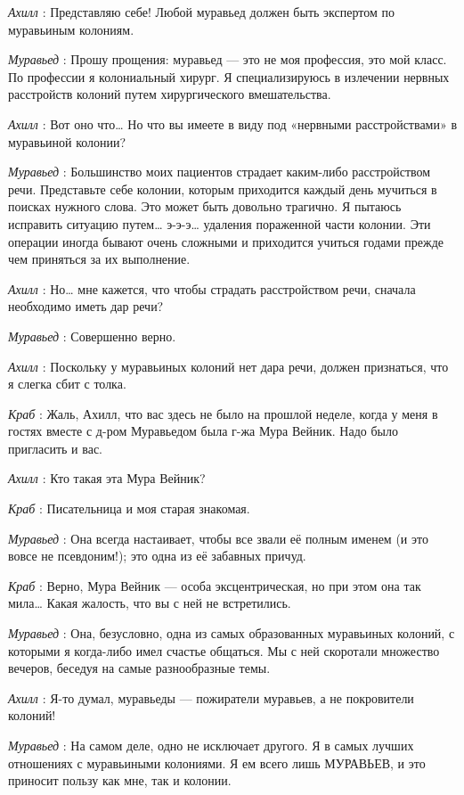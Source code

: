 \documentclass[../main.tex]{subfiles}
\begin{document}
\begin{dialogue}
\emph{Ахилл} : Представляю себе! Любой муравьед должен быть экспертом по муравьиным колониям.

\emph{Муравьед} : Прошу прощения: муравьед --- это не моя профессия, это мой класс. По профессии я колониальный хирург. Я специализируюсь в излечении нервных расстройств колоний путем хирургического вмешательства.

\emph{Ахилл} : Вот оно что\ldots{} Но что вы имеете в виду под «нервными расстройствами» в муравьиной колонии?

\emph{Муравьед} : Большинство моих пациентов страдает каким-либо расстройством речи. Представьте себе колонии, которым приходится каждый день мучиться в поисках нужного слова. Это может быть довольно трагично. Я пытаюсь исправить ситуацию путем\ldots{} э-э-э\ldots{} удаления пораженной части колонии. Эти операции иногда бывают очень сложными и приходится учиться годами прежде чем приняться за их выполнение.

\emph{Ахилл} : Но\ldots{} мне кажется, что чтобы страдать расстройством речи, сначала необходимо иметь дар речи?

\emph{Муравьед} : Совершенно верно.

\emph{Ахилл} : Поскольку у муравьиных колоний нет дара речи, должен признаться, что я слегка сбит с толка.

\emph{Краб} : Жаль, Ахилл, что вас здесь не было на прошлой неделе, когда у меня в гостях вместе с д-ром Муравьедом была г-жа Мура Вейник. Надо было пригласить и вас.

\emph{Ахилл} : Кто такая эта Мура Вейник?

\emph{Краб} : Писательница и моя старая знакомая.

\emph{Муравьед} : Она всегда настаивает, чтобы все звали её полным именем (и это вовсе не псевдоним!); это одна из её забавных причуд.

\emph{Краб} : Верно, Мура Вейник --- особа эксцентрическая, но при этом она так мила\ldots{} Какая жалость, что вы с ней не встретились.

\emph{Муравьед} : Она, безусловно, одна из самых образованных муравьиных колоний, с которыми я когда-либо имел счастье общаться. Мы с ней скоротали множество вечеров, беседуя на самые разнообразные темы.

\emph{Ахилл} : Я-то думал, муравьеды --- пожиратели муравьев, а не покровители колоний!

\emph{Муравьед} : На самом деле, одно не исключает другого. Я в самых лучших отношениях с муравьиными колониями. Я ем всего лишь МУРАВЬЕВ, и это приносит пользу как мне, так и колонии.


\end{dialogue}
\end{document}
